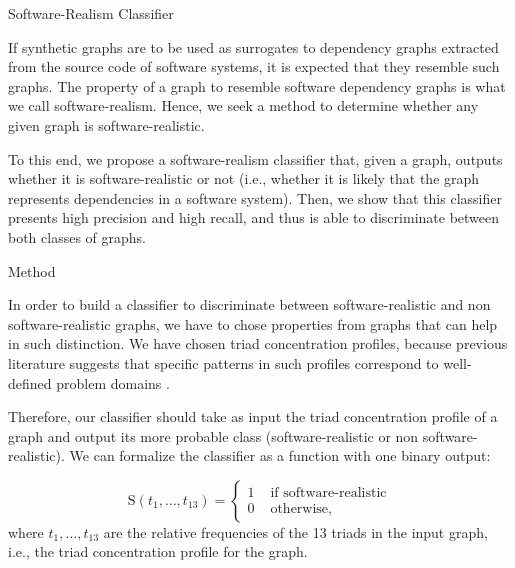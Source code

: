\documentclass[11pt,twocolumn,a4paper,english]{article}
\begin{document}
\begin{section}{Software-Realism Classifier}

	If synthetic graphs are to be used as surrogates to dependency graphs extracted from the source code of software systems, it is expected that they resemble such graphs. The property of a graph to resemble software dependency graphs is what we call software-realism. Hence, we seek a method to determine whether any given graph is software-realistic. %
	
	To this end, we propose a software-realism classifier that, given a graph, outputs whether it is software-realistic or not (i.e., whether it is likely that the graph represents dependencies in a software system). Then, we show that this classifier presents high precision and high recall, and thus is able to discriminate between both classes of graphs. %
		
\begin{subsection}{Method}

In order to build a classifier to discriminate between software-realistic and non software-realistic graphs, we have to chose properties from graphs that can help in such distinction. We have chosen triad concentration profiles, because previous literature suggests that specific patterns in such profiles correspond to well-defined problem domains \cite{Milo2004}.

Therefore, our classifier should take as input the triad concentration profile of a graph and output its more probable class (software-realistic or non software-realistic). We can formalize the classifier as a function with one binary output:

$$
  \mathrm{S}(t_1, \ldots, t_{13}) = \left\{ \begin{array}{rl}
	 1 &\mbox{ if software-realistic} \\
	 0 &\mbox{ otherwise,}
	       \end{array} \right.
$$
where $t_1, \ldots, t_{13}$ are the relative frequencies of the 13 triads in the input graph, i.e., the triad concentration profile for the graph.


\end{subsection}
\end{section}
\end{document}
